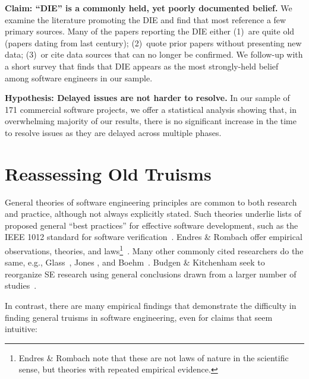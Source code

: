\documentclass[smallcondensed]{svjour3}
\begin{document}
{\bf  Claim: ``DIE'' is a  commonly held, yet poorly documented belief.}
We examine the literature promoting the DIE and find that most reference a few primary sources. Many of the papers reporting the DIE
 either (1)~are quite old (papers dating from last century);
(2)~quote prior papers without presenting   new data; 
(3)~or cite data sources that can no longer be
confirmed. We follow-up with a short survey that finds that DIE appears as the most strongly-held belief among software engineers in our sample. 


{\bf Hypothesis: Delayed issues are not harder to resolve.}
 In our sample of 
 171 commercial software  projects, we offer  a statistical analysis showing that, in overwhelming majority
 of our results, there is no   
 significant increase in the time to resolve issues  as they are delayed across multiple phases.
 


 
 


\section{ Reassessing Old Truisms}
General
theories of software
engineering principles are common to both research and practice, although not always explicitly stated. Such theories underlie  lists of proposed general ``best practices'' for effective software development, such as
the IEEE 1012 standard for software verification~\cite{1012}. 
 Endres \& Rombach offer empirical observations, theories, and laws\footnote{Endres \& Rombach note that these are not laws of nature in the scientific sense, but theories with repeated empirical evidence.}~\cite{endres03}.
 Many other 
commonly cited researchers  do the same, e.g.,
Glass~\cite{glass02}, Jones \cite{jones07}, and Boehm~\cite{boehm00b}.
Budgen \& Kitchenham seek to reorganize SE research using
general
conclusions drawn from a larger number of studies~\cite{kitch04,budgen09}.

In contrast, there are many empirical  findings 
that demonstrate the difficulty in finding general truisms in software engineering, even for claims that seem intuitive:
\end{document}
